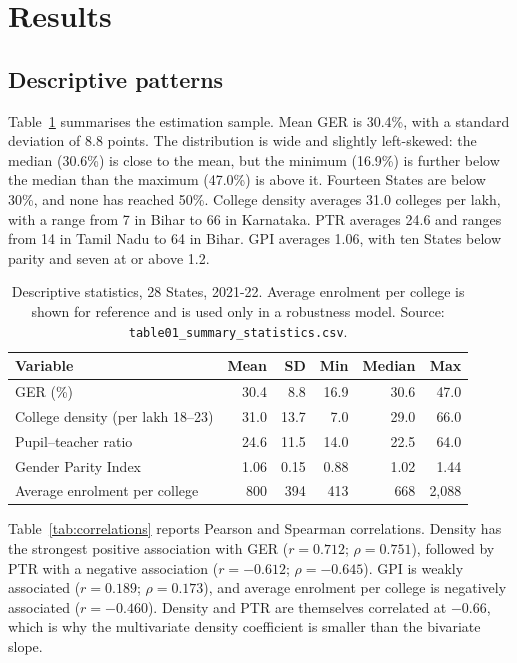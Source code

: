 \section{Results}\label{sec:results}

\subsection{Descriptive patterns}

Table~\ref{tab:descriptives} summarises the estimation sample. Mean GER is 30.4\%, with a standard deviation of 8.8 points. The distribution is wide and slightly left-skewed: the median (30.6\%) is close to the mean, but the minimum (16.9\%) is further below the median than the maximum (47.0\%) is above it. Fourteen States are below 30\%, and none has reached 50\%. College density averages 31.0 colleges per lakh, with a range from 7 in Bihar to 66 in Karnataka. PTR averages 24.6 and ranges from 14 in Tamil Nadu to 64 in Bihar. GPI averages 1.06, with ten States below parity and seven at or above 1.2.

\begin{table}[htbp]
\centering
\small
\caption{Descriptive statistics, 28 States, 2021-22. Average enrolment per college is shown for reference and is used only in a robustness model. Source: \texttt{table01\_summary\_statistics.csv}.}
\label{tab:descriptives}
\begin{tabular}{@{}lrrrrr@{}}
\toprule
Variable & Mean & SD & Min & Median & Max \\
\midrule
GER (\%) & 30.4 & 8.8 & 16.9 & 30.6 & 47.0 \\
College density (per lakh 18--23) & 31.0 & 13.7 & 7.0 & 29.0 & 66.0 \\
Pupil--teacher ratio & 24.6 & 11.5 & 14.0 & 22.5 & 64.0 \\
Gender Parity Index & 1.06 & 0.15 & 0.88 & 1.02 & 1.44 \\
Average enrolment per college & 800 & 394 & 413 & 668 & 2,088 \\
\bottomrule
\end{tabular}
\end{table}

Table~\ref{tab:correlations} reports Pearson and Spearman correlations. Density has the strongest positive association with GER (\(r = 0.712\); \(\rho = 0.751\)), followed by PTR with a negative association (\(r = -0.612\); \(\rho = -0.645\)). GPI is weakly associated (\(r = 0.189\); \(\rho = 0.173\)), and average enrolment per college is negatively associated (\(r = -0.460\)). Density and PTR are themselves correlated at \(-0.66\), which is why the multivariate density coefficient is smaller than the bivariate slope.

